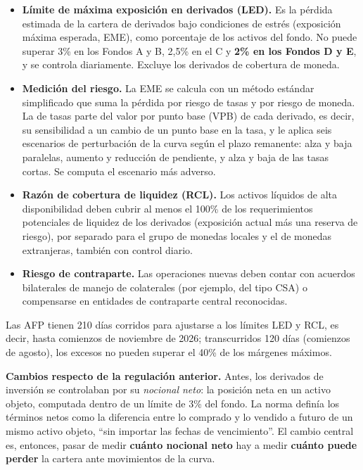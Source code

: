 \documentclass[11pt,letterpaper]{article}
\begin{document}
\begin{itemize}[leftmargin=*]
\item \textbf{Límite de máxima exposición en derivados (LED).} Es la pérdida estimada de
la cartera de derivados bajo condiciones de estrés (exposición máxima esperada, EME),
como porcentaje de los activos del fondo. No puede superar 3\% en los Fondos A y B,
2,5\% en el C y \textbf{2\% en los Fondos D y E}, y se controla diariamente. Excluye los
derivados de cobertura de moneda.
\item \textbf{Medición del riesgo.} La EME se calcula con un método estándar
simplificado que suma la pérdida por riesgo de tasas y por riesgo de moneda. La de
tasas parte del valor por punto base (VPB) de cada derivado, es decir, su sensibilidad
a un cambio de un punto base en la tasa, y le aplica seis escenarios de perturbación de
la curva según el plazo remanente: alza y baja paralelas, aumento y reducción de
pendiente, y alza y baja de las tasas cortas. Se computa el escenario más adverso.
\item \textbf{Razón de cobertura de liquidez (RCL).} Los activos líquidos de alta
disponibilidad deben cubrir al menos el 100\% de los requerimientos potenciales de
liquidez de los derivados (exposición actual más una reserva de riesgo), por separado
para el grupo de monedas locales y el de monedas extranjeras, también con control
diario.
\item \textbf{Riesgo de contraparte.} Las operaciones nuevas deben contar con acuerdos
bilaterales de manejo de colaterales (por ejemplo, del tipo CSA) o compensarse en
entidades de contraparte central reconocidas.
\end{itemize}

Las AFP tienen 210 días corridos para ajustarse a los límites LED y RCL, es decir,
hasta comienzos de noviembre de 2026; transcurridos 120 días (comienzos de agosto), los
excesos no pueden superar el 40\% de los márgenes máximos.

\textbf{Cambios respecto de la regulación anterior.} Antes, los derivados de inversión
se controlaban por su \emph{nocional neto}: la posición neta en un activo objeto,
computada dentro de un límite de 3\% del fondo. La norma definía los términos netos
como la diferencia entre lo comprado y lo vendido a futuro de un mismo activo objeto,
``sin importar las fechas de vencimiento''. El cambio central es, entonces, pasar de
medir \textbf{cuánto nocional neto} hay a medir \textbf{cuánto puede perder} la cartera
ante movimientos de la curva.
\end{document}
